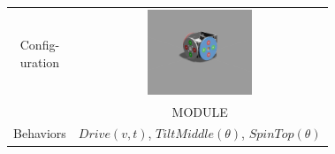 \documentclass{standalone}
\newcommand{\picHeight}{1in}
\begin{document}
        \begin{tabular}{| c | c |}
            \hline
            \pbox{20cm}{Config-\\uration} &
            \includegraphics[height=\picHeight]{driver1.png} \\
            ~ & MODULE \\ \hline
            Behaviors &
            \pbox{20cm}{\(Drive(v,t)\), \(TiltMiddle(\theta)\), \\ \(SpinTop(\theta) \)} \\ \hline
        \end{tabular}
\end{document}
